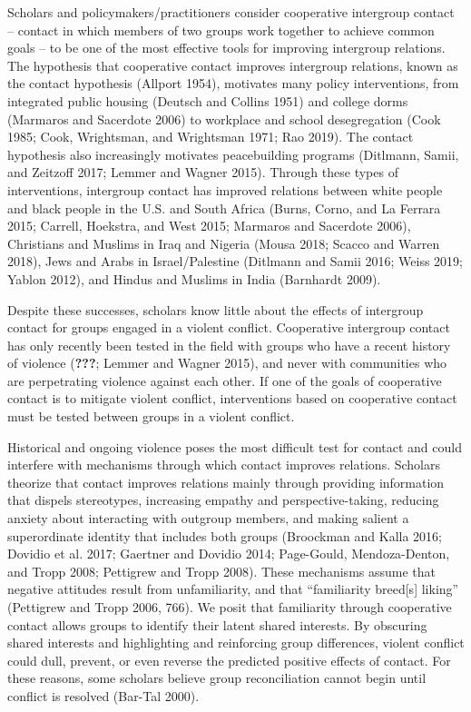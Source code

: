 \documentclass[11pt]{article}
\begin{document}
Scholars and policymakers/practitioners consider cooperative intergroup
contact -- contact in which members of two groups work together to
achieve common goals -- to be one of the most effective tools for
improving intergroup relations. The hypothesis that cooperative contact
improves intergroup relations, known as the contact hypothesis (Allport
1954), motivates many policy interventions, from integrated public
housing (Deutsch and Collins 1951) and college dorms (Marmaros and
Sacerdote 2006) to workplace and school desegregation (Cook 1985; Cook,
Wrightsman, and Wrightsman 1971; Rao 2019). The contact hypothesis also
increasingly motivates peacebuilding programs (Ditlmann, Samii, and
Zeitzoff 2017; Lemmer and Wagner 2015). Through these types of
interventions, intergroup contact has improved relations between white
people and black people in the U.S. and South Africa (Burns, Corno, and
La Ferrara 2015; Carrell, Hoekstra, and West 2015; Marmaros and
Sacerdote 2006), Christians and Muslims in Iraq and Nigeria (Mousa 2018;
Scacco and Warren 2018), Jews and Arabs in Israel/Palestine (Ditlmann
and Samii 2016; Weiss 2019; Yablon 2012), and Hindus and Muslims in
India (Barnhardt 2009).

Despite these successes, scholars know little about the effects of
intergroup contact for groups engaged in a violent conflict. Cooperative
intergroup contact has only recently been tested in the field with
groups who have a recent history of violence ({\textbf{???}}; Lemmer and
Wagner 2015), and never with communities who are perpetrating violence
against each other. If one of the goals of cooperative contact is to
mitigate violent conflict, interventions based on cooperative contact
must be tested between groups in a violent conflict.

Historical and ongoing violence poses the most difficult test for
contact and could interfere with mechanisms through which contact
improves relations. Scholars theorize that contact improves relations
mainly through providing information that dispels stereotypes,
increasing empathy and perspective-taking, reducing anxiety about
interacting with outgroup members, and making salient a superordinate
identity that includes both groups (Broockman and Kalla 2016; Dovidio et
al. 2017; Gaertner and Dovidio 2014; Page-Gould, Mendoza-Denton, and
Tropp 2008; Pettigrew and Tropp 2008). These mechanisms assume that
negative attitudes result from unfamiliarity, and that ``familiarity
breed{[}s{]} liking'' (Pettigrew and Tropp 2006, 766). We posit that
familiarity through cooperative contact allows groups to identify their
latent shared interests. By obscuring shared interests and highlighting
and reinforcing group differences, violent conflict could dull, prevent,
or even reverse the predicted positive effects of contact. For these
reasons, some scholars believe group reconciliation cannot begin until
conflict is resolved (Bar-Tal 2000).
\end{document}
